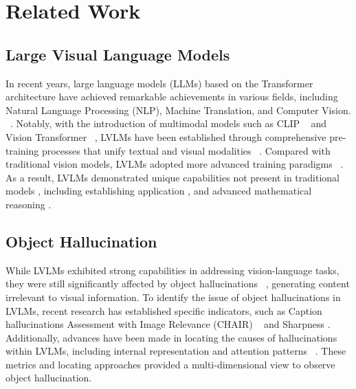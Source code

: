 \section{Related Work}
\subsection{Large Visual Language Models}
In recent years, large language models (LLMs) based on the Transformer architecture have achieved remarkable achievements in various fields, including Natural Language Processing (NLP), Machine Translation, and Computer Vision. ~\cite{zhao2023survey, achiam2023gpt, chiang2023vicuna}. Notably, with the introduction of multimodal models such as CLIP ~\cite{radford2021learning} and Vision Transformer ~\cite{dosovitskiy2021an}, LVLMs have been established through comprehensive pre-training processes that unify textual and visual modalities ~\cite{bai2023qwen, Ye_2024_CVPR}. Compared with traditional vision models, LVLMs adopted more advanced training paradigms ~\cite{wei2022finetuned, liu2024visual}. As a result, LVLMs demonstrated unique capabilities not present in traditional models \cite{yang2023mm}, including establishing application \cite{Ye_2024_CVPR}, and advanced mathematical reasoning \cite{pmlr-v202-driess23a}.

\subsection{Object Hallucination}
While LVLMs exhibited strong capabilities in addressing vision-language tasks, they were still significantly affected by object hallucinations ~\cite{li-etal-2023-evaluating}, generating content irrelevant to visual information. To identify the issue of object hallucinations in LVLMs, recent research has established specific indicators, such as Caption hallucinations Assessment with Image Relevance (CHAIR) ~\cite{rohrbach-etal-2018-object} and Sharpness \cite{chen2024context}. Additionally, advances have been made in locating the causes of hallucinations within LVLMs, including internal representation and attention patterns ~\cite{han2024semantic, mahaut-etal-2024-factual}. These metrics and locating approaches provided a multi-dimensional view to observe object hallucination. 


